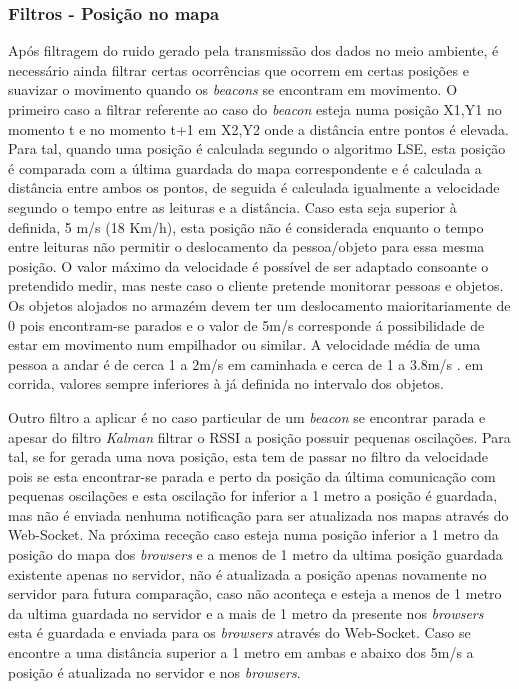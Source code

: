 \subsubsection{Filtros - Posição no mapa}

\par Após filtragem do ruido gerado pela transmissão dos dados no meio ambiente, é necessário ainda filtrar certas ocorrências que ocorrem em certas posições e suavizar o movimento quando os \textit{beacons} se encontram em movimento. O primeiro caso a filtrar referente ao caso do \textit{beacon} esteja numa posição X1,Y1 no momento t e no momento t+1 em X2,Y2 onde a distância entre pontos é elevada. Para tal, quando uma posição é calculada segundo o algoritmo LSE, esta posição é comparada com a última guardada do mapa correspondente e é calculada a distância entre ambos os pontos, de seguida é calculada igualmente a velocidade segundo o tempo entre as leituras e a distância. Caso esta seja superior à definida, 5 m/s (18 Km/h), esta posição não é considerada enquanto o tempo entre leituras não permitir o deslocamento da pessoa/objeto para essa mesma posição. O valor máximo da velocidade é possível de ser adaptado consoante o pretendido medir, mas neste caso o cliente pretende monitorar pessoas e objetos. Os objetos alojados no armazém devem ter um deslocamento maioritariamente de 0 pois encontram-se parados e o valor de 5m/s corresponde á possibilidade de estar em movimento num empilhador ou similar. A velocidade média de uma pessoa a andar é de cerca 1 a 2m/s em caminhada\cite{walkingSpeed} e cerca de 1 a 3.8m/s \cite{Long2013}. em corrida, valores sempre inferiores à já definida no intervalo dos objetos.
\par Outro filtro a aplicar é no caso particular de um \textit{beacon} se encontrar parada e apesar do filtro \textit{Kalman} filtrar o RSSI a posição possuir pequenas oscilações. Para tal, se for gerada uma nova posição, esta tem de passar no filtro da velocidade pois se esta encontrar-se parada e perto da posição da última comunicação com pequenas oscilações e esta oscilação for inferior a 1 metro a posição é guardada, mas não é enviada nenhuma notificação para ser atualizada nos mapas através do Web-Socket. Na próxima receção caso esteja numa posição inferior a 1 metro da posição do mapa dos \textit{browsers} e a menos de 1 metro da ultima posição guardada existente apenas no servidor, não é atualizada a posição apenas novamente no servidor para futura comparação, caso não aconteça e esteja a menos de 1 metro da ultima guardada no servidor e a mais de 1 metro da presente nos \textit{browsers} esta é guardada e enviada para os \textit{browsers} através do Web-Socket. Caso se encontre a uma distância superior a 1 metro em ambas e abaixo dos 5m/s a posição é atualizada no servidor e nos \textit{browsers}.

